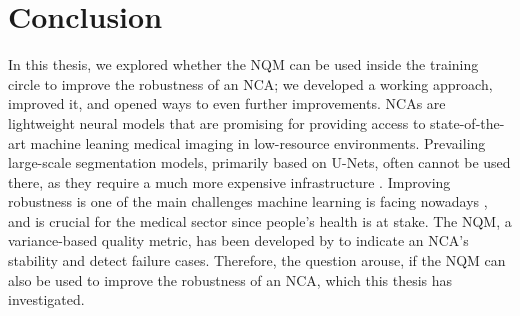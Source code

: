 \chapter{Conclusion}
\label{conclusions}
%
In this thesis, we explored whether the NQM can be used inside the training circle to improve the robustness of an NCA; we developed a working approach, improved it, and opened ways to even further improvements.
NCAs are lightweight neural models that are promising for providing access to state-of-the-art machine leaning medical imaging in low-resource environments. Prevailing large-scale segmentation models, primarily based on U-Nets, often cannot be used there, as they require a much more expensive infrastructure \cite{kalkhof:2023:M3D-NCA}. 
Improving robustness is one of the main challenges machine learning is facing nowadays \cite{Yan:2019:DomainShiftsInMedSeg, Zhou:2023:DomainGeneralization_alsoAugmentation}, and is crucial for the medical sector since people's health is at stake. 
The NQM, a variance-based quality metric, has been developed by \cite{kalkhof:2023:M3D-NCA} to indicate an NCA's stability and detect failure cases. Therefore, the question arouse, if the NQM can also be used to improve the robustness of an NCA, which this thesis has investigated.


